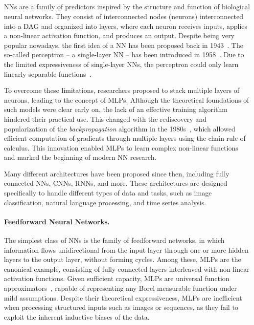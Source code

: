 \subsection[Neural networks]{}\label{subsec:neural-networks}
%
\Glspl{NN} are a family of predictors inspired by the structure and function of biological neural networks.
%
They consist of interconnected nodes (neurons) interconnected into a \gls{DAG} and organized into layers, where each neuron receives inputs, applies a non-linear activation function, and produces an output.
%
Despite being very popular nowadays, the first idea of a \gls{NN} has been proposed back in 1943~\cite{mcculloch1943logical}.
%
The so-called perceptron -- a single-layer \gls{NN} -- has been introduced in 1958~\cite{rosenblatt1958perceptron}.
%
Due to the limited expressiveness of single-layer \glspl{NN}, the perceptron could only learn linearly separable functions~\cite{DBLP:books/daglib/0066902}.

To overcome these limitations, researchers proposed to stack multiple layers of neurons, leading to the concept of \glspl{MLP}.
%
Although the theoretical foundations of such models were clear early on, the lack of an effective training algorithm hindered their practical use.
%
This changed with the rediscovery and popularization of the \textit{backpropagation} algorithm in the 1980s~\cite{rumelhart1986learning}, which allowed efficient computation of gradients through multiple layers using the chain rule of calculus.
%
This innovation enabled \glspl{MLP} to learn complex non-linear functions and marked the beginning of modern \gls{NN} research.

Many different architectures have been proposed since then, including fully connected \glspl{NN}, \glspl{CNN}, \glspl{RNN}, and more.
%
These architectures are designed specifically to handle different types of data and tasks, such as image classification, natural language processing, and time series analysis.

\paragraph{Feedforward Neural Networks.}
%
The simplest class of \glspl{NN} is the family of feedforward networks, in which information flows unidirectional from the input layer through one or more hidden layers to the output layer, without forming cycles.
%
Among these, \glspl{MLP} are the canonical example, consisting of fully connected layers interleaved with non-linear activation functions.
%
Given sufficient capacity, \glspl{MLP} are universal function approximators~\cite{hornik1989multilayer}, capable of representing any Borel measurable function under mild assumptions.
%
Despite their theoretical expressiveness, \glspl{MLP} are inefficient when processing structured inputs such as images or sequences, as they fail to exploit the inherent inductive biases of the data.

